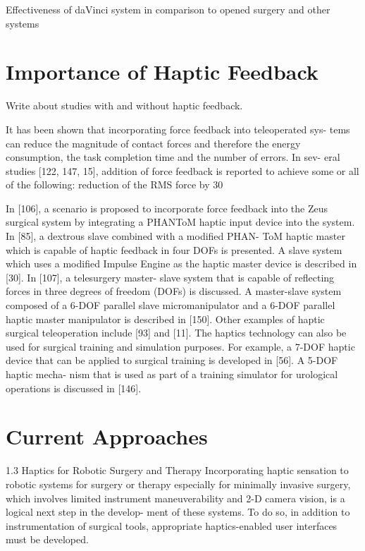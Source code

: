 Effectiveness of daVinci system in comparison to opened surgery and other systems \cite{yu_safety_2014}



\section{Importance of Haptic Feedback}
\label{sec:hapticFeedbackImportance}
Write about studies with and without haptic feedback.

It has been shown that incorporating force feedback into teleoperated sys- tems can reduce the magnitude of contact forces and therefore the energy consumption, the task completion time and the number of errors. In sev- eral studies [122, 147, 15], addition of force feedback is reported to achieve some or all of the following: reduction of the RMS force by 30%

In [106], a scenario is proposed to incorporate force feedback into the Zeus surgical system by integrating a PHANToM haptic input device into the system. In [85], a dextrous slave combined with a modified PHAN- ToM haptic master which is capable of haptic feedback in four DOFs is presented. A slave system which uses a modified Impulse Engine as the haptic master device is described in [30]. In [107], a telesurgery master- slave system that is capable of reflecting forces in three degrees of freedom (DOFs) is discussed. A master-slave system composed of a 6-DOF parallel slave micromanipulator and a 6-DOF parallel haptic master manipulator is described in [150]. Other examples of haptic surgical teleoperation include [93] and [11]. The haptics technology can also be used for surgical training and simulation purposes. For example, a 7-DOF haptic device that can be applied to surgical training is developed in [56]. A 5-DOF haptic mecha- nism that is used as part of a training simulator for urological operations is discussed in [146]. 


\section{Current Approaches}
\label{sec:CurAppr}

1.3 Haptics for Robotic Surgery and Therapy 
Incorporating haptic sensation to robotic systems for surgery or therapy especially for minimally invasive surgery, which involves limited instrument maneuverability and 2-D camera vision, is a logical next step in the develop- ment of these systems. To do so, in addition to instrumentation of surgical tools, appropriate haptics-enabled user interfaces must be developed.
 

